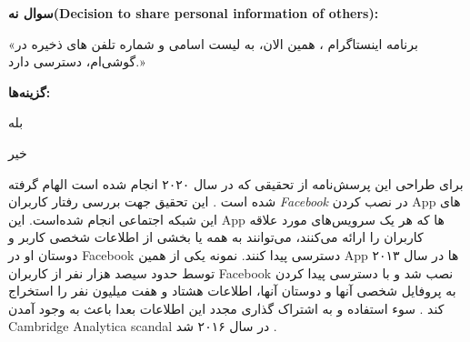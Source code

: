 \textbf{سوال نه(\gls{Decision to share personal information of others}):}

«برنامه اینستاگرام ، همین الان، به لیست اسامی و شماره تلفن های ذخیره در گوشی‌ام، دسترسی دارد.» 

\textbf{گزینه‌ها:}

بله

خیر

برای طراحی این پرسش‌نامه از تحقیقی که در سال ۲۰۲۰ انجام شده است الهام گرفته شده است
\!\citep{vanderschyffInformationPrivacyBehavior2020a}.
این تحقیق جهت بررسی رفتار کاربران
\textit{\gls{Facebook}}
در نصب  کردن
\gls{App}
\!‌های
این شبکه اجتماعی انجام شده‌است. این
\gls{App}
\!‌ها
که هر یک سرویس‌های مورد علاقه کاربران را ارائه می‌کنند، می‌توانند به همه یا بخشی از اطلاعات شخصی
کاربر و دوستان او در
\gls{Facebook}
دسترسی پیدا کنند. نمونه یکی از همین
\gls{App}
\!‌ها
در سال ۲۰۱۳ توسط حدود سیصد هزار نفر از کاربران
\gls{Facebook}
نصب شد و با دسترسی پیدا کردن به پروفایل شخصی آنها و دوستان آنها،
اطلاعات هشتاد و هفت میلیون‌ نفر را استخراج کند
\citep{confessoreCambridgeAnalyticaFacebook2018,salinasZuckerbergCambridgeAnalytica,smithThereOpenSecret}.
سوء استفاده و به اشتراک گذاری مجدد این اطلاعات بعدا باعث
به وجود آمدن
\gls{Cambridge Analytica scandal}
در سال ۲۰۱۶ شد
\!\citep{gonzalezGlobalReactionsCambridge2019,grewalSuspendingCambridgeAnalytica2018}.



